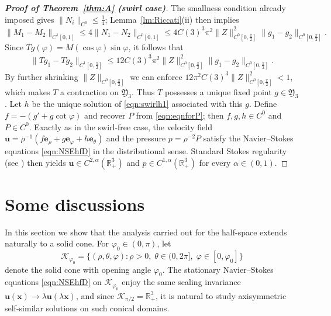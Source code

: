 \documentclass{amsart}
\newcommand{\Bu}{{\boldsymbol{u}}}
\newcommand{\Be}{{\boldsymbol{e}}}
\newcommand{\Bx}{{\boldsymbol{x}}}
\newcommand{\R}{\mathbb{R}}
\begin{document}
\begin{proof}[\textbf{Proof of Theorem~\ref{thm:A} (swirl case)}]
The smallness condition already imposed gives $\|N_{i}\|_{C^{0}}\le\frac14$; Lemma~\ref{lm:Riccati}(ii) then implies
\[
\|M_{1}-M_{2}\|_{C^{1}[0,1]}\le 4\|N_{1}-N_{2}\|_{C^{0}[0,1]}
\le 4 C(3)^{3} \pi^{2} \|Z\|_{C^{0}[0,\frac{\pi}{2}]}^{2}\|g_{1}-g_{2}\|_{C^{0}[0,\frac{\pi}{2}]}.
\]
Since $Tg(\varphi)=M(\cos\varphi)\sin\varphi$, it follows that
\begin{align}\label{eqn:swirlContraction}
\|Tg_1-Tg_2\|_{C^1[0,\frac{\pi}{2}]}\le 12  C(3)^3 \pi^2 \|Z\|_{C^0[0,\frac{\pi}{2}]}^2\|g_1-g_2\|_{C^0[0,\frac{\pi}{2}]}.
\end{align}
By further shrinking $\|Z\|_{C^{0}[0,\frac{\pi}{2}]}$ we can enforce $12\pi^{2} C(3)^{3}\|Z\|_{C^{0}[0,\frac{\pi}{2}]}^{2}<1$,
which makes $T$ a contraction on $\mathfrak{Y}_{3}$. Thus $T$ possesses a unique fixed point $g\in\mathfrak{Y}_{3}$.  Let $h$ be the unique solution of \eqref{eqn:swirlh1} associated with this $g$.  
Define $f = -(g' + g\cot\varphi)$ and recover $P$ from \eqref{eqn:eqnforP}; then $f,g,h\in C^{0}$ and $P\in C^{0}$.  
Exactly as in the swirl-free case, the velocity field $\Bu = \rho^{-1}(f\Be_\rho + g\Be_\varphi + h\Be_\theta)$ and the pressure $p = \rho^{-2}P$ satisfy the Navier--Stokes equations \eqref{eqn:NSEhfD} in the distributional sense.  
Standard Stokes regularity (see \cite[Chapter~IV]{Galdi11}) then yields $\Bu\in C^{2,\alpha}(\R^{3}_{+})$ and $p\in C^{1,\alpha}(\R^{3}_{+})$ for every $\alpha\in(0,1)$.
\end{proof}



\section{Some discussions}\label{sec:Discussions}

In this section we show that the analysis carried out for the half-space extends naturally to a solid cone.  
For $\varphi_0\in(0,\pi)$, let
\begin{equation}\label{eqn:defsolidcone}
\mathcal{K}_{\varphi_0}= \{ (\rho,\theta,\varphi): \rho>0,\; \theta\in(0,2\pi],\; \varphi\in[0,\varphi_0] \}
\end{equation}
denote the solid cone with opening angle $\varphi_0$. 
The stationary Navier--Stokes equations \eqref{eqn:NSEhfD} on $\mathcal{K}_{\varphi_0}$ enjoy the same scaling invariance 
$\Bu(\Bx)\to\lambda\Bu(\lambda\Bx)$, and since $\mathcal{K}_{\pi/2}=\R^3_+$, it is natural to study axisymmetric self-similar solutions on such conical domains.
\end{document}
